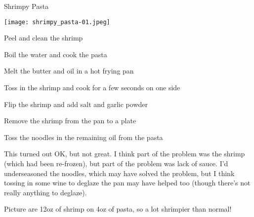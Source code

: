 \documentclass{recipe}
\begin{document}
\begin{recipe}{Shrimpy Pasta}

  \begin{ingredients}
  \end{ingredients}

  \begin{images}
    \begin{image}
      \texttt{[image: shrimpy\_pasta-01.jpeg]}
    \end{image}
  \end{images}

  \begin{steps}
  \item Peel and clean the shrimp
  \item Boil the water and cook the pasta
  \item Melt the butter and oil in a hot frying pan
  \item Toss in the shrimp and cook for a few seconds on one side
  \item Flip the shrimp and add salt and garlic powder
  \item Remove the shrimp from the pan to a plate
  \item Toss the noodles in the remaining oil from the pasta
  \end{steps}

  \begin{notes}
  \item This turned out OK, but not great.  I think part of the
    problem was the shrimp (which had been re-frozen), but part of the
    problem was lack of sauce.  I'd underseasoned the noodles, which
    may have solved the problem, but I think tossing in some wine to
    deglaze the pan may have helped too (though there's not really
    anything to deglaze).
  \item Picture are 12oz of shrimp on 4oz of pasta, so a lot shrimpier
    than normal!
  \end{notes}
\end{recipe}
\end{document}
